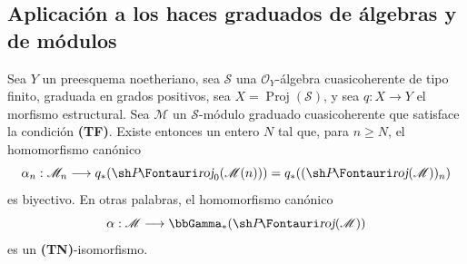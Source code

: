 \subsection{Aplicación a los haces graduados de álgebras y de módulos}
\label{subsection:III.2.3}
\label{subsection:III.2.3-fr}

\begin{theorem}[2.3.1]
\label{III.2.3.1}
\label{III.2.3.1-fr}
Sea $Y$ un preesquema noetheriano, sea $\mathcal S$ una $\mathcal O_Y$-álgebra cuasicoherente de tipo finito, graduada en grados positivos, sea
$X=\operatorname{Proj}(\mathcal S)$,
y sea $q:X\to Y$ el morfismo estructural.
Sea $\mathcal M$ un $\mathcal S$-módulo graduado cuasicoherente que satisface la condición \textup{\textbf{(TF)}}.
Existe entonces un entero $N$ tal que, para $n\geq N$, el homomorfismo canónico \textup{}
\[
\alpha_n:\mathcal M_n\longrightarrow
q_*(\shProj_0(\mathcal M(n)))
=q_*((\shProj(\mathcal M))_n)
\]
es biyectivo.
En otras palabras, el homomorfismo canónico
\[
\alpha:\mathcal M\longrightarrow\bbGamma_*(\shProj(\mathcal M))
\]
es un \textup{\textbf{(TN)}}-isomorfismo.
\end{theorem}

